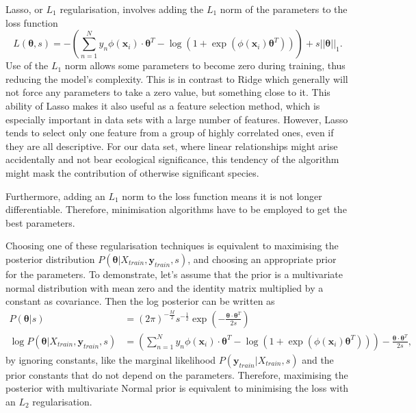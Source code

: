  Lasso, or $L_1$ regularisation, involves adding the $L_1$ norm of the parameters to the loss function
 \begin{equation}
L(\bm{\theta},s)= - \left(\sum_{n=1}^N y_n \phi\left(\mathbf{x}_{i}\right)\cdot\bm{\theta}^{T} -\log\left(1+\exp\left(\phi\left(\mathbf{x}_{i}\right)\bm{\theta}^{T}\right)\right) \right) + s||\bm{\theta}||_1.
\end{equation}
	Use of the $L_1$ norm allows some parameters to become zero during training, thus reducing the model's complexity. This is in contrast to Ridge which generally will not force any parameters to take a zero value, but something close to it.
	This ability of Lasso makes it also useful as a feature selection method, which is especially important in data sets with a large number of features. 
	However, Lasso tends to select only one feature from a group of highly correlated ones, even if they are all descriptive. For our data set, where linear relationships might arise accidentally and not bear ecological significance, this tendency of the algorithm might mask the contribution of otherwise significant species. 
	
	
	Furthermore, adding an $L_1$ norm to the loss function means it is not longer differentiable. Therefore, minimisation algorithms have to be employed to get the best parameters. 
	
	Choosing one of these regularisation techniques is equivalent to maximising the posterior distribution $P(\bm{\theta}|X_{train},\mathbf{y}_{train},s)$, and choosing an appropriate prior for the parameters. To demonstrate, let's assume that the prior is a multivariate normal distribution with mean zero and the identity matrix multiplied by a constant as covariance. Then the log posterior can be written as
	\begin{align}
		P(\bm{\theta}|s) &= (2\pi)^{-\frac{M}{2}}s^{-\frac{1}{2}}\exp\left(-\frac{\bm{\theta}\cdot\bm{\theta}^T}{2s}\right)\\
		\log P(\bm{\theta}|X_{train},\mathbf{y}_{train},s) &=\left(\sum_{n=1}^N y_n \phi\left(\mathbf{x}_{i}\right)\cdot\bm{\theta}^{T} -\log\left(1+\exp\left(\phi\left(\mathbf{x}_{i}\right)\bm{\theta}^{T}\right)\right) \right) - \frac{\bm{\theta}\cdot\bm{\theta}^T}{2s},
	\end{align}
  by ignoring constants, like the marginal likelihood $P(\mathbf{y}_{train}|X_{train},s)$ and the prior constants that do not depend on the parameters. Therefore, maximising the posterior with multivariate Normal prior is equivalent to minimising the loss with an $L_2$ regularisation. 
  
